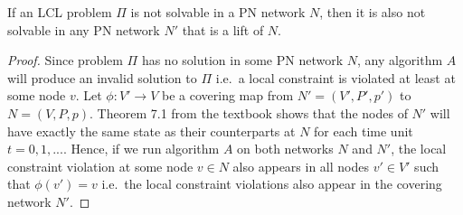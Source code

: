 \begin{lemma} \label{lem:lcl_unsolvability:from_multiple_to_lift}
If an LCL problem $\Pi$ is not solvable in a PN network $N$, then it is also not solvable in any PN network $N'$ that is a lift of $N$.
\end{lemma}
\begin{proof}
    Since problem $\Pi$ has no solution in some PN network $N$, any algorithm $A$ will produce an invalid solution to $\Pi$ i.e.\ a local constraint is violated at least at some node $v$.
    Let $\phi: V' \rightarrow V$ be a covering map from $N'=(V', P', p')$ to $N=(V, P, p)$.
    Theorem 7.1 from the textbook \cite{HirvonenSuomelaDistAlg2020} shows that the nodes of $N'$ will have exactly the same state as their counterparts at $N$ for each time unit $t=0,1,...$\;.
    Hence, if we run algorithm $A$ on both networks $N$ and $N'$, the local constraint violation at some node $v \in N$ also appears in all nodes $v' \in V'$ such that $\phi(v') = v$ i.e.\ the local constraint violations also appear in the covering network $N'$.
\end{proof}

